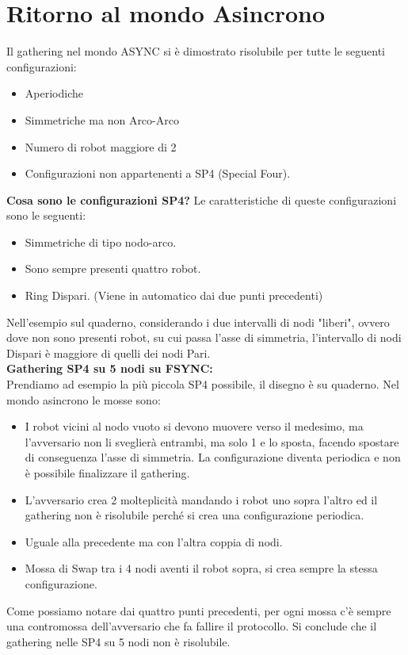 \section{Ritorno al mondo Asincrono}
Il gathering nel mondo ASYNC si è dimostrato risolubile per tutte le seguenti
configurazioni:
\begin{itemize}
    \item Aperiodiche
    \item Simmetriche ma non Arco-Arco
    \item Numero di robot maggiore di 2
    \item Configurazioni non appartenenti a SP4 (Special Four).
\end{itemize}
\textbf{Cosa sono le configurazioni SP4?} Le caratteristiche di queste
configurazioni sono le seguenti:
\begin{itemize}
    \item Simmetriche di tipo nodo-arco.
    \item Sono sempre presenti quattro robot.
    \item Ring Dispari. (Viene in automatico dai due punti precedenti)
\end{itemize}{}
Nell'esempio sul quaderno, considerando i due intervalli di nodi "liberi",
ovvero dove non sono presenti robot, su cui passa l'asse di simmetria,
l'intervallo di nodi Dispari è maggiore di quelli dei nodi Pari.\\

\textbf{Gathering SP4 su 5 nodi su FSYNC:}\\
Prendiamo ad esempio la più piccola SP4 possibile, il disegno è su quaderno. Nel
mondo asincrono le mosse sono:
\begin{itemize}
    \item I robot vicini al nodo vuoto si devono muovere verso il medesimo, ma
          l'avversario non li sveglierà entrambi, ma solo 1 e lo sposta, facendo
          spostare di conseguenza l'asse di simmetria. La configurazione diventa
          periodica e non è possibile finalizzare il gathering.
    \item L'avversario crea 2 molteplicità mandando i robot uno sopra l'altro ed
          il gathering non è risolubile perché si crea una configurazione periodica.
    \item Uguale alla precedente ma con l'altra coppia di nodi.
    \item Mossa di Swap tra i 4 nodi aventi il robot sopra, si crea sempre la
          stessa configurazione.
\end{itemize}
Come possiamo notare dai quattro punti precedenti, per ogni mossa c'è sempre una
contromossa dell'avversario che fa fallire il protocollo. Si conclude che il
gathering nelle SP4 su 5 nodi non è risolubile.\\

